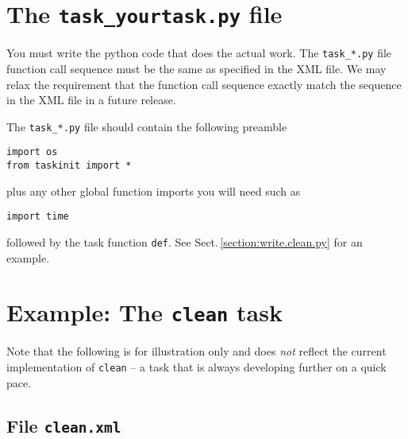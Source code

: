 
\section{The {\tt task\_yourtask.py} file}
\label{section:write.py}

You must write the python code that does the actual work. The
{\tt task\_*.py} file function call sequence must be the same as specified
in the XML file. We may relax the requirement that the function call
sequence exactly match the sequence in the XML file in a future
release.


The {\tt task\_*.py} file should contain the following preamble
\begin{verbatim}
import os
from taskinit import *
\end{verbatim} 

plus any other global function imports you will need such as

\begin{verbatim}
import time
\end{verbatim}
followed by the task function {\tt def}.  See Sect.\,\ref{section:write.clean.py}
for an example.



\section{Example: The {\tt clean} task}
\label{section:write.clean}

Note that the following is for illustration only and does {\it not} reflect
the current implementation of {\tt clean} -- a task that is always
developing further on a quick pace.


\subsection{File {\tt clean.xml} }
\label{section:write.clean.xml}

